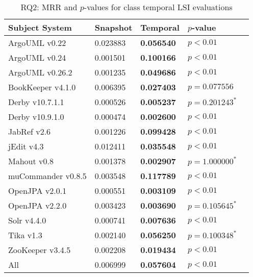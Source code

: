 
\begin{table}[t]
\renewcommand{\arraystretch}{1.3}
\footnotesize
\centering
\caption{RQ2: MRR and $p$-values for class temporal LSI evaluations}
\begin{tabular}{l|ll|ll}
   \toprule
    Subject System & Snapshot & Temporal & $p$-value  \\
    \midrule

ArgoUML v0.22 & 0.023883 & {\bf 0.056540 } & $p < 0.01$ \\
ArgoUML v0.24 & 0.001501 & {\bf 0.100166 } & $p < 0.01$ \\
ArgoUML v0.26.2 & 0.001235 & {\bf 0.049686 } & $p < 0.01$ \\
BookKeeper v4.1.0 & 0.006395 & {\bf 0.027403 } & $p = 0.077556$ \\
Derby v10.7.1.1 & 0.000526 & {\bf 0.005237 } & $p = 0.201243^{*}$ \\
Derby v10.9.1.0 & 0.000474 & {\bf 0.002600 } & $p < 0.01$ \\
JabRef v2.6 & 0.001226 & {\bf 0.099428 } & $p < 0.01$ \\
jEdit v4.3 & 0.012411 & {\bf 0.035548 } & $p < 0.01$ \\
Mahout v0.8 & 0.001378 & {\bf 0.002907 } & $p = 1.000000^{*}$ \\
muCommander v0.8.5 & 0.003548 & {\bf 0.117789 } & $p < 0.01$ \\
OpenJPA v2.0.1 & 0.000551 & {\bf 0.003109 } & $p < 0.01$ \\
OpenJPA v2.2.0 & 0.003423 & {\bf 0.003690 } & $p = 0.105645^{*}$ \\
Solr v4.4.0 & 0.000741 & {\bf 0.007636 } & $p < 0.01$ \\
Tika v1.3 & 0.002140 & {\bf 0.056250 } & $p = 0.100348^{*}$ \\
ZooKeeper v3.4.5 & 0.002208 & {\bf 0.019434 } & $p < 0.01$ \\
\midrule
All & 0.006999 & {\bf 0.057604 } & $p < 0.01$ \\

    \bottomrule
\end{tabular}
\label{table:rq2:class:lsi}
\end{table}

